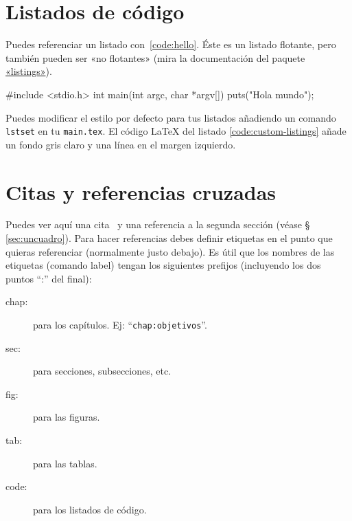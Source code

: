 \section{Listados de código}
\label{sec:listado}

Puedes referenciar un listado con~\ref{code:hello}. Éste es un listado flotante,
pero también pueden ser «no flotantes» (mira la documentación del paquete
\href{http://www.ctan.org/get/macros/latex/contrib/listings/listings.pdf}{«listings»}).

\begin{listing}[
  float=ht,
  language = C,
  caption  = {«Hola mundo» en C},
  label    = code:hello]
#include <stdio.h>
int main(int argc, char *argv[]) {
    puts("Hola mundo\n");
}
\end{listing}

Puedes modificar el estilo por defecto para tus listados añadiendo un comando
\texttt{lstset} en tu \texttt{main.tex}. El código LaTeX del listado \ref{code:custom-listings}
añade un fondo gris claro y una línea en el margen izquierdo.

\begin{listing}[
  float=h!,
  caption  = {Personalizando los listados de código},
  label    = code:custom-listings]
\end{listing}



\section{Citas y referencias cruzadas}

Puedes ver aquí una cita~\cite{design_patterns} y una referencia a la segunda sección
(véase \S\,\ref{sec:uncuadro}). Para hacer referencias debes definir etiquetas en el punto
que quieras referenciar (normalmente justo debajo). Es útil que los nombres de las
etiquetas (comando label) tengan los siguientes prefijos (incluyendo los dos puntos ``:''
del final):

\begin{description}
\item[chap:] para los capítulos. Ej: ``\texttt{chap:objetivos}''.
\item[sec:] para secciones, subsecciones, etc.
\item[fig:] para las figuras.
\item[tab:] para las tablas.
\item[code:] para los listados de código.
\end{description}

